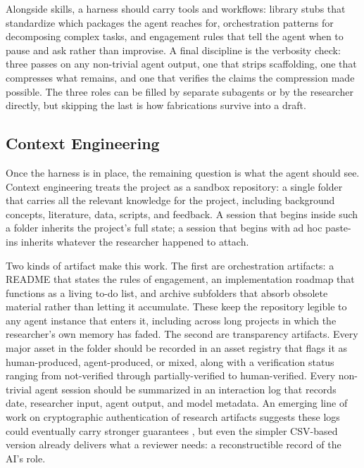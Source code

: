 \documentclass[11pt]{article}
\begin{document}
Alongside skills, a harness should carry tools and workflows: library stubs that standardize which packages the agent reaches for, orchestration patterns for decomposing complex tasks, and engagement rules that tell the agent when to pause and ask rather than improvise. A final discipline is the verbosity check: three passes on any non-trivial agent output, one that strips scaffolding, one that compresses what remains, and one that verifies the claims the compression made possible. The three roles can be filled by separate subagents or by the researcher directly, but skipping the last is how fabrications survive into a draft.

\subsection{Context Engineering}
\label{sec:deploy-context}

Once the harness is in place, the remaining question is what the agent should see. Context engineering treats the project as a sandbox repository: a single folder that carries all the relevant knowledge for the project, including background concepts, literature, data, scripts, and feedback. A session that begins inside such a folder inherits the project's full state; a session that begins with ad hoc paste-ins inherits whatever the researcher happened to attach.

Two kinds of artifact make this work. The first are orchestration artifacts: a README that states the rules of engagement, an implementation roadmap that functions as a living to-do list, and archive subfolders that absorb obsolete material rather than letting it accumulate. These keep the repository legible to any agent instance that enters it, including across long projects in which the researcher's own memory has faded. The second are transparency artifacts. Every major asset in the folder should be recorded in an asset registry that flags it as human-produced, agent-produced, or mixed, along with a verification status ranging from not-verified through partially-verified to human-verified. Every non-trivial agent session should be summarized in an interaction log that records date, researcher input, agent output, and model metadata. An emerging line of work on cryptographic authentication of research artifacts suggests these logs could eventually carry stronger guarantees \citep{gordon2025datanomad}, but even the simpler CSV-based version already delivers what a reviewer needs: a reconstructible record of the AI's role.
\end{document}

